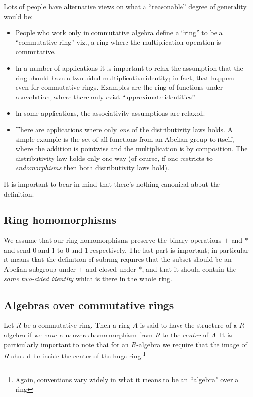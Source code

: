 \documentclass[a4paper]{amsart}
\begin{document}
Lots of people have alternative views on what a ``reasonable'' degree
of generality would be:

\begin{itemize}

\item People who work only in commutative algebra define a ``ring'' to
  be a ``commutative ring'' viz., a ring where the multiplication
  operation is commutative.

\item In a number of applications it is important to relax the
  assumption that the ring should have a two-sided multiplicative
  identity; in fact, that happens even for commutative rings. Examples
  are the ring of functions under convolution, where there only exist
  ``approximate identities''.

\item In some applications, the associativity assumptions are
  relaxed.
\item There are applications where only {\em one} of the
  distributivity laws holds. A simple example is the set of all
  functions from an Abelian group to itself, where the addition is
  pointwise and the multiplication is by composition. The
  distributivity law holds only one way (of course, if one restricts
  to {\em endomorphisms} then both distributivity laws hold).
\end{itemize}

It is important to bear in mind that there's nothing canonical about
the definition.

\subsection{Ring homomorphisms}

We assume that our ring homomorphisms preserve the binary operations
$+$ and $*$ and send $0$ and $1$ to $0$ and $1$ respectively. The last
part is important; in particular it means that the definition of
subring requires that the subset should be an Abelian subgroup under
$+$ and closed under $*$, and that it should contain the {\em same
  two-sided identity} which is there in the whole ring.


\subsection{Algebras over commutative rings}

Let $R$ be a commutative ring. Then a ring $A$ is said to have the
structure of a $R$-algebra if we have a nonzero homomorphism from $R$
to the {\em center} of $A$. It is particularly important to note that
for an $R$-algebra we require that the image of $R$ should be inside
the center of the huge ring.\footnote{Again, conventions vary widely
  in what it means to be an ``algebra'' over a ring}
\end{document}
